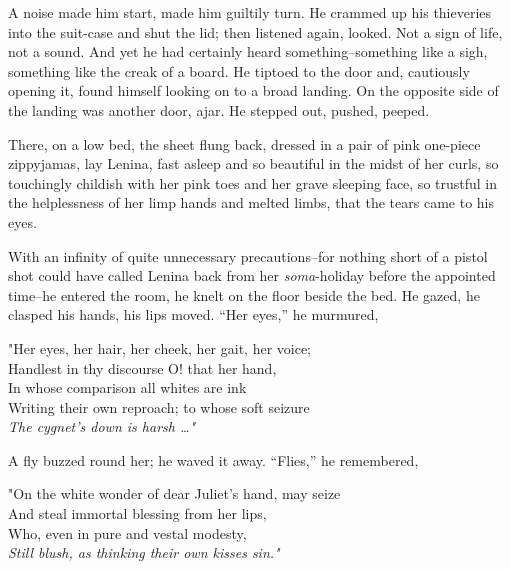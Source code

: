 \documentclass[12pt]{report}
\begin{document}
A noise made him start, made him guiltily turn. He crammed up his
thieveries into the suit-case and shut the lid; then listened again,
looked. Not a sign of life, not a sound. And yet he had certainly heard
something--something like a sigh, something like the creak of a board.
He tiptoed to the door and, cautiously opening it, found himself looking
on to a broad landing. On the opposite side of the landing was another
door, ajar. He stepped out, pushed, peeped.

There, on a low bed, the sheet flung back, dressed in a pair of pink
one-piece zippyjamas, lay Lenina, fast asleep and so beautiful in the
midst of her curls, so touchingly childish with her pink toes and her
grave sleeping face, so trustful in the helplessness of her limp hands
and melted limbs, that the tears came to his eyes.

With an infinity of quite unnecessary precautions--for nothing short of
a pistol shot could have called Lenina back from her \emph{soma}-holiday
before the appointed time--he entered the room, he knelt on the floor
beside the bed. He gazed, he clasped his hands, his lips moved. ``Her
eyes,'' he murmured,

\emph{}

"Her eyes, her hair, her cheek, her gait, her voice;\\

Handlest in thy discourse O! that her hand,\\

In whose comparison all whites are ink\\

Writing their own reproach; to whose soft seizure\\

\emph{The cygnet's down is harsh \ldots{}"\\
}

A fly buzzed round her; he waved it away. ``Flies,'' he remembered,

\emph{}

"On the white wonder of dear Juliet's hand, may seize\\

And steal immortal blessing from her lips,\\

Who, even in pure and vestal modesty,\\

\emph{Still blush, as thinking their own kisses sin."\\
}
\end{document}
